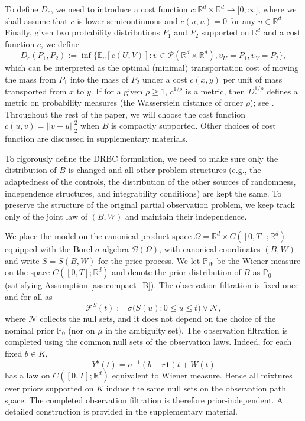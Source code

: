 \documentclass[11pt]{article}
\theoremstyle{definition}
\begin{document}
To define $D_c$, we need to introduce a cost function $c:\mathbb{R}^{d}\times\mathbb{R}%
^{d}\rightarrow\lbrack0,\infty]$, where we shall assume that $c$ is lower
semicontinuous and $c\left(  u,u\right)  =0$ for any $u\in
\mathbb{R}^{d}$. Finally, given two probability distributions ${P}_1$ and ${P}_2$ supported on
$\mathbb{R}^{d}$ and a cost function $c$, we define
\begin{equation}\label{ot}
D_{c}({P}_1, {P}_2):=\inf\{\mathbb{E}_{\upsilon}[c(U,V)]:\upsilon\in\mathcal{P}(\mathbb{R}^{d}%
\times\mathbb{R}^{d}),\upsilon_{U}={P}_1,\upsilon_{V}={P}_2\},
\end{equation}
which can be interpreted as the optimal (minimal) transportation cost of
moving the mass from ${P}_1$ into the mass of ${P}_2$ under a cost $c\left(
x,y\right)  $ per unit of mass transported from $x$ to $y$. If for a given
$\rho\ge 1$, $c^{1/\rho} $ is a metric, then $D_{c}^{1/\rho}$ defines a metric on probability measures (the Wasserstein distance of order $\rho$); see \cite{villani2008optimal}.
Throughout the rest of the paper, we will choose the cost
function $c(u,v)=||v-u||_{2}^{2}$ when $B$ is compactly supported. Other choices of cost function are discussed in supplementary materials. 


{To rigorously define the DRBC formulation, we need to make sure only the distribution of $B$ is changed and all other problem structures (e.g., the adaptedness of the controls, the distribution of the other sources of randomness, independence structures, and integrability conditions) are kept the same. 
To preserve the structure of the original partial observation problem, we keep track only of the joint law of $(B,W)$ and maintain their independence. 

We place the model on the canonical product space $\Omega=\mathbb{R}^d\times C([0,T];\mathbb{R}^d)$ equipped with the Borel $\sigma$-algebra $\mathcal{B}(\Omega)$, with canonical coordinates $(B,W)$ and write $S=S(B,W)$ for the price process. We let $\mathbb{P}_W$ be the Wiener measure on the space $C\left([0,T]; \mathbb{R}^d\right)$ and denote the prior distribution of $B$ as $\mathbb{P}_0$ (satisfying Assumption \ref{ass:compact_B}). The observation filtration is fixed once and for all as
$$\mathcal F^S(t):=\sigma\big(S(u):0\le u\le t\big)\vee\mathcal N,$$
where $\mathcal N$ collects the null sets, and it does not depend on the choice of the nominal prior $\mathbb P_0$ (nor on $\mu$ in the ambiguity set). %
The observation filtration is completed using the common null sets of the observation laws.
Indeed, for each fixed \(b\in K\),
\[
Y^b(t)=\sigma^{-1}(b-r\mathbf 1)t+W(t)
\]
has a law on \(C([0,T];\mathbb R^d)\) equivalent to Wiener measure. Hence all mixtures
over priors supported on \(K\) induce the same null sets on the observation path space.
The completed observation filtration is therefore prior-independent. A detailed construction
is provided in the supplementary material.
}
\end{document}
